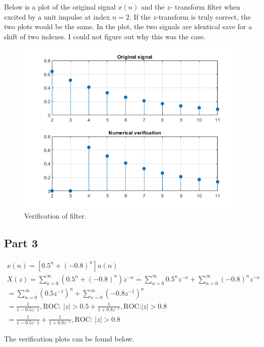 \documentclass{article}
\begin{document}
Below is a plot of the original signal \(x(n)\) and the \(z\)-%
transform filter when excited by a unit impulse at index \(n=2\).
If the \(z\)-transform is truly correct, the two plots would be
the same. In the plot, the two signals are identical save for
a shift of two indexes. I could not figure out why this was
the case.

\begin{figure}[H]
    \centering
    \includegraphics[width=\textwidth]{"Images/4-1 Fig1"}
    \caption{Verification of filter.}
    \label{plot:4.1.2}
\end{figure}

\subsection*{Part 3}
\begin{gather*}
    x(n) = \left[0.5^n + (-0.8)^n\right]u(n)\\
    X(z) = \sum_{n = 0}^\infty \left( 0.5^n + (-0.8)^n \right)z^{-n}
    = \sum_{n = 0}^\infty 0.5^nz^{-n} + \sum_{n=0}^\infty (-0.8)^nz^{-n}\\
    = \sum_{n=0}^\infty \left(0.5z^{-1}\right)^n + \sum_{n=0}^\infty (-0.8z^{-1})^n\\
    = \frac{1}{1 - 0.5z^-1}, \text{ROC: } |z| > 0.5 + \frac{1}{1 + 0.8z^{-1}}, \text{ROC:} |z| > 0.8\\
    = \frac{1}{1 - 0.5z^-1} + \frac{1}{1 + 0.8z^{-1}}, \text{ROC: } |z| > 0.8
\end{gather*}

The verification plots can be found below.
\end{document}
